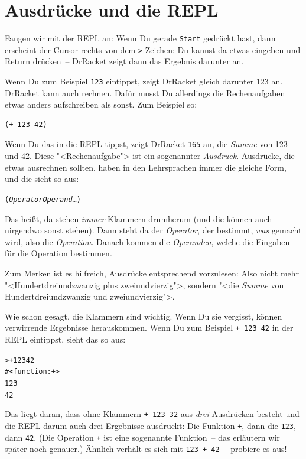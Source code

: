 \section{Ausdrücke und die REPL}

Fangen wir mit der REPL an: Wenn Du gerade \texttt{Start} gedrückt
hast, dann erscheint der Cursor rechts von dem \verb|>|-Zeichen: Du
kannst da etwas eingeben und Return drücken~-- DrRacket zeigt dann
das Ergebnis darunter an.

Wenn Du zum Beispiel \texttt{123} eintippst, zeigt DrRacket gleich
darunter 123 an.  DrRacket kann auch rechnen.  Dafür musst Du
allerdings die Rechenaufgaben etwas anders aufschreiben als sonst.
Zum Beispiel so:
%
\begin{verbatim}
(+ 123 42)
\end{verbatim}
%
Wenn Du das in die REPL tippst, zeigt DrRacket \texttt{165} an, die
\textit{Summe} von 123 und 42.  Diese "<Rechenaufgabe">
ist ein sogenannter \textit{Ausdruck}.  Ausdrücke, die
etwas ausrechnen sollten, haben in den Lehrsprachen immer die gleiche
Form, und die sieht so aus:
%
\begin{alltt}
(\textnormal{\textit{Operator}} \textnormal{\textit{Operand}} \ldots)
\end{alltt}
%
Das heißt, da stehen \emph{immer} Klammern drumherum
(und die können auch nirgendwo sonst stehen).  Dann steht da der
\textit{Operator}, der bestimmt, \emph{was} gemacht
wird, also die \textit{Operation}.  Danach kommen die
\textit{Operanden}, welche die Eingaben
für die Operation bestimmen.

Zum Merken ist es hilfreich, Ausdrücke entsprechend vorzulesen: Also
nicht mehr "<Hundertdreiundzwanzig plus zweiundvierzig">, sondern
"<die \emph{Summe} von Hundertdreiundzwanzig und zweiundvierzig">.

Wie schon gesagt, die Klammern sind wichtig.  Wenn Du sie vergisst,
können verwirrende Ergebnisse herauskommen.  Wenn Du zum Beispiel
\texttt{+ 123 42} in der REPL eintippst, sieht das so aus:
%
\begin{alltt}
> + {\color{green}123 42}
{\color{blue}#<function:+>
123
42}
\end{alltt}
%
Das liegt daran, dass ohne Klammern \texttt{+ 123 32} aus \emph{drei}
Ausdrücken besteht und die REPL darum auch drei Ergebnisse ausdruckt:
Die Funktion \texttt{+}, dann die \texttt{123}, dann \texttt{42}.
(Die Operation \texttt{+} ist eine sogenannte Funktion~-- das
erläutern wir später noch genauer.)  Ähnlich verhält es sich mit
\texttt{123 + 42}~-- probiere es aus!

